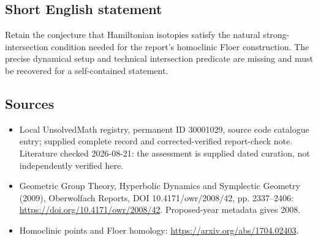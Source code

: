 \documentclass[11pt]{article}
\begin{document}
\subsection{Short English statement}
Retain the conjecture that Hamiltonian isotopies satisfy the natural strong-intersection condition needed for the report's homoclinic Floer construction. The precise dynamical setup and technical intersection predicate are missing and must be recovered for a self-contained statement.
\subsection{Sources}
\begin{itemize}
\item Local UnsolvedMath registry, permanent ID 30001029, source code catalogue entry; supplied complete record and corrected-verified report-check note. Literature checked 2026-08-21: the assessment is supplied dated curation, not independently verified here.
\item Geometric Group Theory, Hyperbolic Dynamics and Symplectic Geometry (2009), Oberwolfach Reports, DOI 10.4171/owr/2008/42, pp. 2337--2406: \url{https://doi.org/10.4171/owr/2008/42}. Proposed-year metadata gives 2008.
\item Homoclinic points and Floer homology: \url{https://arxiv.org/abs/1704.02403}.
\end{itemize}
\end{document}
